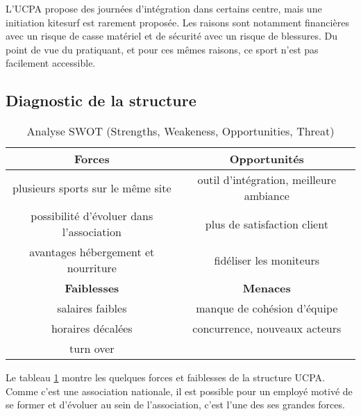\documentclass[11pt,a4paper]{report}
\begin{document}
L'UCPA propose des journées d'intégration dans certains centre, mais
une initiation kitesurf est rarement proposée. Les raisons sont notamment
financières avec un risque de casse matériel et de sécurité avec un risque de blessures. Du point de vue du pratiquant, et pour ces m\^emes raisons, ce sport n'est pas facilement  accessible.


\subsection{Diagnostic de la structure}
\begin{table}[h]
\centering
\begin{tabular}{|c|c|}
        \hline
        \textbf{Forces}                          & \textbf{Opportunités} \\ 
        \hline
        plusieurs sports sur le m\^eme site      &  outil d'intégration, meilleure ambiance\\
        possibilité d'évoluer dans l'association & plus de satisfaction client  \\
        avantages hébergement et nourriture      & fidéliser les moniteurs             \\
        \hline
        \textbf{Faiblesses}                      &  \textbf{Menaces} \\ 
        \hline
        salaires faibles                         & manque de cohésion d'équipe \\
        horaires décalées                         & concurrence, nouveaux acteurs   \\
        turn over                                &                               \\
        \hline
\end{tabular}
\caption{Analyse SWOT (Strengths, Weakeness, Opportunities, Threat)\label{swot}}
\end{table}
Le tableau \ref{swot} montre les quelques forces et faiblesses de la 
structure UCPA. Comme c'est une association nationale, il est 
possible pour un  employé motivé de se former et d'évoluer
au sein de l'association, c'est l'une des ses grandes forces.
 
\end{document}
